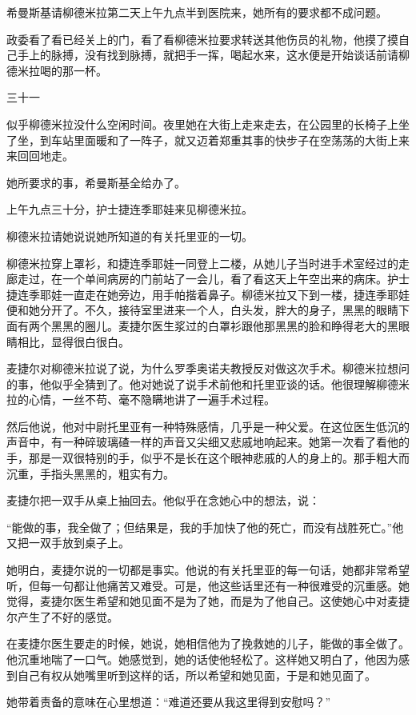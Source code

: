 希曼斯基请柳德米拉第二天上午九点半到医院来，她所有的要求都不成问题。

政委看了看已经关上的门，看了看柳德米拉要求转送其他伤员的礼物，他摸了摸自己手上的脉搏，没有找到脉搏，就把手一挥，喝起水来，这水便是开始谈话前请柳德米拉喝的那一杯。

三十一

似乎柳德米拉没什么空闲时间。夜里她在大街上走来走去，在公园里的长椅子上坐了坐，到车站里面暖和了一阵子，就又迈着郑重其事的快步子在空荡荡的大街上来来回回地走。

她所要求的事，希曼斯基全给办了。

上午九点三十分，护士捷连季耶娃来见柳德米拉。

柳德米拉请她说说她所知道的有关托里亚的一切。

柳德米拉穿上罩衫，和捷连季耶娃一同登上二楼，从她儿子当时进手术室经过的走廊走过，在一个单间病房的门前站了一会儿，看了看这天上午空出来的病床。护士捷连季耶娃一直走在她旁边，用手帕揩着鼻子。柳德米拉又下到一楼，捷连季耶娃便和她分开了。不久，接待室里进来一个人，白头发，胖大的身子，黑黑的眼睛下面有两个黑黑的圈儿。麦捷尔医生浆过的白罩衫跟他那黑黑的脸和睁得老大的黑眼睛相比，显得很白很白。

麦捷尔对柳德米拉说了说，为什么罗季奥诺夫教授反对做这次手术。柳德米拉想问的事，他似乎全猜到了。他对她说了说手术前他和托里亚谈的话。他很理解柳德米拉的心情，一丝不苟、毫不隐瞒地讲了一遍手术过程。

然后他说，他对中尉托里亚有一种特殊感情，几乎是一种父爱。在这位医生低沉的声音中，有一种碎玻璃碴一样的声音又尖细又悲戚地响起来。她第一次看了看他的手，那是一双很特别的手，似乎不是长在这个眼神悲戚的人的身上的。那手粗大而沉重，手指头黑黑的，粗实有力。

麦捷尔把一双手从桌上抽回去。他似乎在念她心中的想法，说：

“能做的事，我全做了；但结果是，我的手加快了他的死亡，而没有战胜死亡。”他又把一双手放到桌子上。

她明白，麦捷尔说的一切都是事实。他说的有关托里亚的每一句话，她都非常希望听，但每一句都让他痛苦又难受。可是，他这些话里还有一种很难受的沉重感。她觉得，麦捷尔医生希望和她见面不是为了她，而是为了他自己。这使她心中对麦捷尔产生了不好的感觉。

在麦捷尔医生要走的时候，她说，她相信他为了挽救她的儿子，能做的事全做了。他沉重地喘了一口气。她感觉到，她的话使他轻松了。这样她又明白了，他因为感到自己有权从她嘴里听到这样的话，所以希望和她见面，于是和她见面了。

她带着责备的意味在心里想道：“难道还要从我这里得到安慰吗？”

